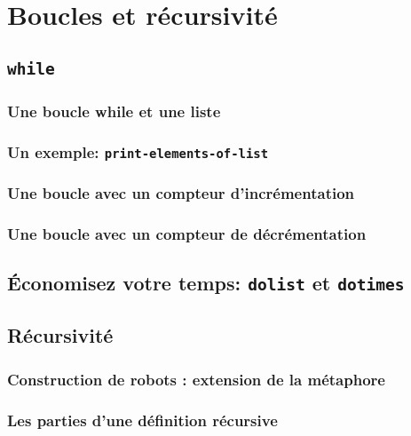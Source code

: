 \chapter{Boucles et récursivité}

\section{\texttt{while}}

 \subsection{Une boucle while et une liste}

 \subsection{Un exemple:
   \texttt{print-elements-of-list}}

 \subsection{Une boucle avec un compteur
   d'incrémentation}

\subsection{Une boucle avec un compteur de
  décrémentation}

\section{\'Economisez votre temps: \texttt{dolist} et
  \texttt{dotimes}}

 \section{Récursivité}

 \subsection{Construction de robots : extension de la
   métaphore}

 \subsection{Les parties d'une définition récursive}

